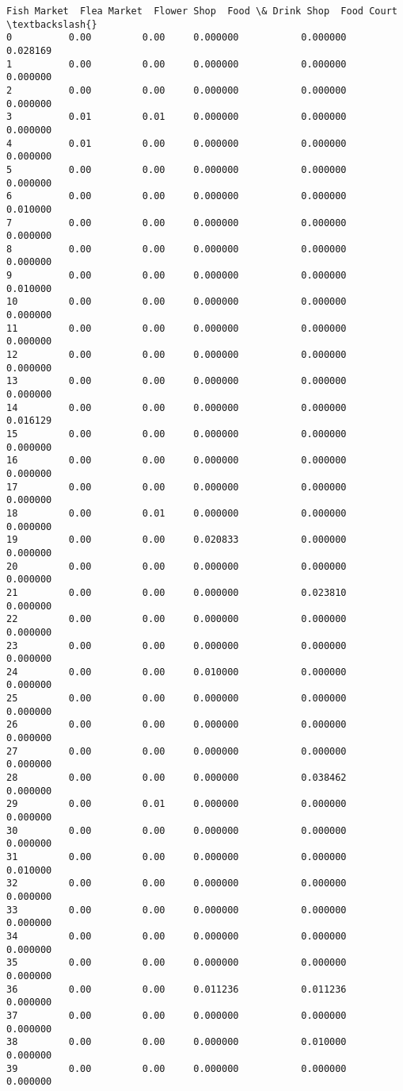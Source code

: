 \documentclass[11pt]{article}
\begin{document}
\begin{tcolorbox}[breakable, size=fbox, boxrule=.5pt, pad at break*=1mm, opacityfill=0]
\begin{Verbatim}[commandchars=\\\{\}]
    Fish Market  Flea Market  Flower Shop  Food \& Drink Shop  Food Court  \textbackslash{}
0          0.00         0.00     0.000000           0.000000    0.028169
1          0.00         0.00     0.000000           0.000000    0.000000
2          0.00         0.00     0.000000           0.000000    0.000000
3          0.01         0.01     0.000000           0.000000    0.000000
4          0.01         0.00     0.000000           0.000000    0.000000
5          0.00         0.00     0.000000           0.000000    0.000000
6          0.00         0.00     0.000000           0.000000    0.010000
7          0.00         0.00     0.000000           0.000000    0.000000
8          0.00         0.00     0.000000           0.000000    0.000000
9          0.00         0.00     0.000000           0.000000    0.010000
10         0.00         0.00     0.000000           0.000000    0.000000
11         0.00         0.00     0.000000           0.000000    0.000000
12         0.00         0.00     0.000000           0.000000    0.000000
13         0.00         0.00     0.000000           0.000000    0.000000
14         0.00         0.00     0.000000           0.000000    0.016129
15         0.00         0.00     0.000000           0.000000    0.000000
16         0.00         0.00     0.000000           0.000000    0.000000
17         0.00         0.00     0.000000           0.000000    0.000000
18         0.00         0.01     0.000000           0.000000    0.000000
19         0.00         0.00     0.020833           0.000000    0.000000
20         0.00         0.00     0.000000           0.000000    0.000000
21         0.00         0.00     0.000000           0.023810    0.000000
22         0.00         0.00     0.000000           0.000000    0.000000
23         0.00         0.00     0.000000           0.000000    0.000000
24         0.00         0.00     0.010000           0.000000    0.000000
25         0.00         0.00     0.000000           0.000000    0.000000
26         0.00         0.00     0.000000           0.000000    0.000000
27         0.00         0.00     0.000000           0.000000    0.000000
28         0.00         0.00     0.000000           0.038462    0.000000
29         0.00         0.01     0.000000           0.000000    0.000000
30         0.00         0.00     0.000000           0.000000    0.000000
31         0.00         0.00     0.000000           0.000000    0.010000
32         0.00         0.00     0.000000           0.000000    0.000000
33         0.00         0.00     0.000000           0.000000    0.000000
34         0.00         0.00     0.000000           0.000000    0.000000
35         0.00         0.00     0.000000           0.000000    0.000000
36         0.00         0.00     0.011236           0.011236    0.000000
37         0.00         0.00     0.000000           0.000000    0.000000
38         0.00         0.00     0.000000           0.010000    0.000000
39         0.00         0.00     0.000000           0.000000    0.000000


\end{Verbatim}
\end{tcolorbox}
\end{document}
